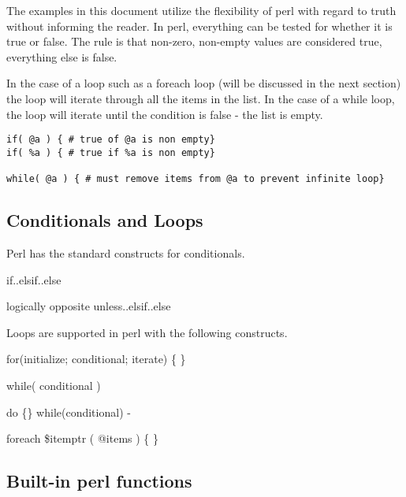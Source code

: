 \documentclass{article}
\begin{document}
The examples in this document utilize the flexibility of
perl with regard to truth without informing the reader.  In perl,
everything can be tested for whether it is true or false.  The rule is
that non-zero, non-empty values are considered true, everything else
is false.
\par
In the case of a loop such as a foreach loop (will be discussed in the
next section) the loop will iterate through all the items in the list.
In the case of a while loop, the loop will iterate until the condition
is false - the list is empty.  

\begin{verbatim}
if( @a ) { # true of @a is non empty}
if( %a ) { # true if %a is non empty}

while( @a ) { # must remove items from @a to prevent infinite loop}
\end{verbatim}

\subsection{Conditionals and Loops}

\par
Perl has the standard constructs for conditionals.

\begin{list}{}{}

\item if..elsif..else
\item logically opposite unless..elsif..else

\end{list}

Loops are supported in perl with the following constructs.

\begin{list}{}{}

\item for(initialize; conditional; iterate) \{ \}
\item while( conditional ) {}
\item do \{\} while(conditional) - 
\item foreach \$itemptr ( @items ) \{ \}

\end{list}

\subsection{Built-in perl functions}
\end{document}
